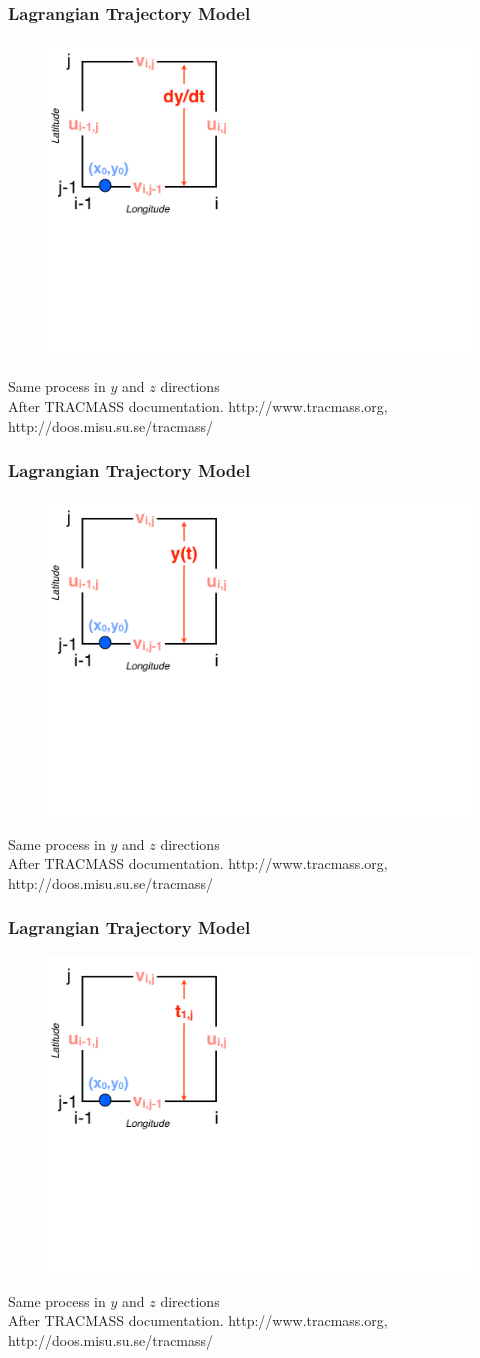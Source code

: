 \documentclass[ignorenonframetext]{beamer}
\begin{document}
\begin{frame}[t,noframenumbering]\frametitle{Lagrangian Trajectory Model}
	\begin{figure}[htbp]
		\centering
		\includegraphics[width=.5\textwidth]{figures/tracmass_box7}
	\end{figure}
	{\Large Same process in $y$ and $z$ directions}
	\tiny{\\After TRACMASS documentation. http://www.tracmass.org, http://doos.misu.su.se/tracmass/}
\end{frame}
\begin{frame}[t,noframenumbering]\frametitle{Lagrangian Trajectory Model}
	\begin{figure}[htbp]
		\centering
		\includegraphics[width=.5\textwidth]{figures/tracmass_box8}
	\end{figure}
	{\Large Same process in $y$ and $z$ directions}
	\tiny{\\After TRACMASS documentation. http://www.tracmass.org, http://doos.misu.su.se/tracmass/}
\end{frame}
\begin{frame}[t,noframenumbering]\frametitle{Lagrangian Trajectory Model}
	\begin{figure}[htbp]
		\centering
		\includegraphics[width=.5\textwidth]{figures/tracmass_box9}
	\end{figure}
	{\Large Same process in $y$ and $z$ directions}
	\tiny{\\After TRACMASS documentation. http://www.tracmass.org, http://doos.misu.su.se/tracmass/}
\end{frame}
\end{document}
